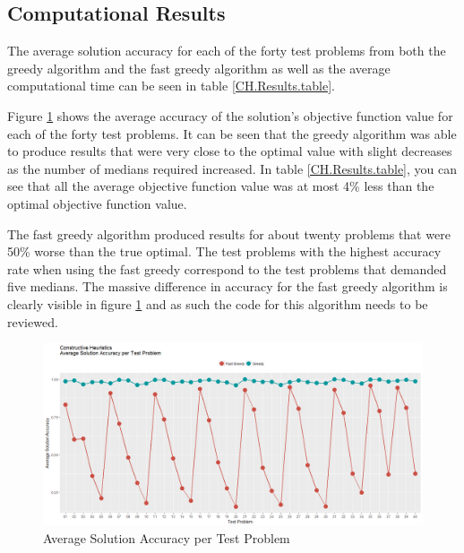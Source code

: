 \documentclass[11pt]{article}
\begin{document}
	
	\subsection{Computational Results} \label{classicheuristics.constructive.results}
	The average solution accuracy for each of the forty test problems from both the greedy algorithm and the fast greedy algorithm as well as the average computational time can be seen in table \ref{CH.Results.table}.  
	
	Figure \ref{CH.av.acc} shows the average accuracy of the solution's objective function value for each of the forty test problems.  It can be seen that the greedy algorithm was able to produce results that were very close to the optimal value with slight decreases as the number of medians required increased.  In table \ref{CH.Results.table}, you can see that all the average objective function value was at most 4\% less than the optimal objective function value.
	
	The fast greedy algorithm produced results for about twenty problems that were 50\% worse than the true optimal.  The test problems with the highest accuracy rate when using the fast greedy correspond to the test problems that demanded five medians.  The massive difference in accuracy for the fast greedy algorithm is clearly visible in figure \ref{CH.av.acc} and as such the code for this algorithm needs to be reviewed.
	
	\begin{figure}[H]
		\begin{center}
			\includegraphics[width=14cm]{CHavacc.png}
			\caption{Average Solution Accuracy per Test Problem}
			\label{CH.av.acc}
		\end{center}
	\end{figure}
\end{document}
